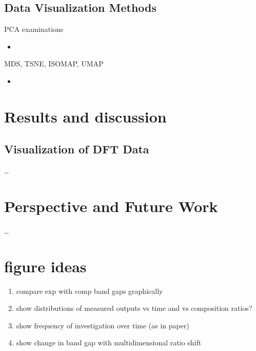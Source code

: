 \documentclass[10pt, compress]{beamer}
\begin{document}
\subsection{Data Visualization Methods}
\label{sec:org2066d0f}
\begin{frame}[label={sec:orgfc43b57}]{PCA examinations}
\begin{itemize}
\item 
\end{itemize}
\end{frame}
\begin{frame}[label={sec:orge4cdeb7}]{MDS, TSNE, ISOMAP, UMAP}
\begin{itemize}
\item 
\end{itemize}
\newpage
\end{frame}
\section{Results and discussion}
\label{sec:org4b81515}
\subsection{Visualization of DFT Data}
\label{sec:orgf0653fc}
\ldots{}\\
\newpage
\section{Perspective and Future Work}
\label{sec:orgc24c232}
\ldots{}\\

\section{figure ideas}
\label{sec:org147b24d}
\begin{enumerate}
\item compare exp with comp band gaps graphically
\item show distributions of measured outputs vs time and vs composition ratios?
\item show frequency of investigation over time (as in paper)
\item show change in band gap with multidimensional ratio shift
\end{enumerate}
\end{document}
